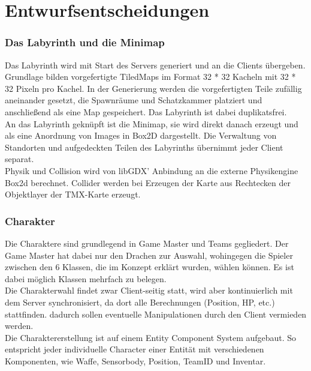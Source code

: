 \documentclass[10pt,a4paper,notitlepage]{scrreprt}
\begin{document}
	\section{Entwurfsentscheidungen}

		\subsubsection{Das Labyrinth und die Minimap}
		
		Das Labyrinth wird mit Start des Servers generiert und an die Clients übergeben. Grundlage bilden vorgefertigte TiledMaps im Format 32 * 32 Kacheln mit 32 * 32 Pixeln pro Kachel. In der Generierung werden die vorgefertigten Teile zufällig aneinander gesetzt, die Spawnräume und Schatzkammer platziert und anschließend als eine Map gespeichert. Das Labyrinth ist dabei duplikatsfrei.\\
		An das Labyrinth geknüpft ist die Minimap, sie wird direkt danach erzeugt und als eine Anordnung von Images in Box2D dargestellt. Die Verwaltung von Standorten und aufgedeckten Teilen des Labyrinths übernimmt jeder Client separat.\\
		Physik und Collision wird von libGDX' Anbindung an die externe Physikengine Box2d berechnet. Collider werden bei Erzeugen der Karte aus Rechtecken der Objektlayer der TMX-Karte erzeugt.
		
		\subsubsection{Charakter}
		
		Die Charaktere sind grundlegend in Game Master und Teams gegliedert. Der Game Master hat dabei nur den Drachen zur Auswahl, wohingegen die Spieler zwischen den 6 Klassen, die im Konzept erklärt wurden, wählen können. Es ist dabei möglich Klassen mehrfach zu belegen.\\
		Die Charakterwahl findet zwar Client-seitig statt, wird aber kontinuierlich mit dem Server synchronisiert, da dort alle Berechnungen (Position, HP, etc.) stattfinden. dadurch sollen eventuelle Manipulationen durch den Client vermieden werden.\\
		Die Charaktererstellung ist auf einem Entity Component System aufgebaut. So entspricht jeder individuelle Character einer Entität mit verschiedenen Komponenten, wie Waffe, Sensorbody, Position, TeamID und Inventar.\\
		
\end{document}
